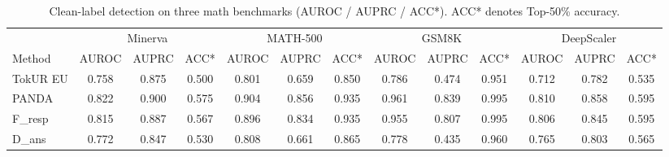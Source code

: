 \begin{table}[t]
\centering
\caption{Clean-label detection on three math benchmarks (AUROC / AUPRC / ACC*). ACC* denotes Top-50\% accuracy.}
\label{tab:main}
\small
\begin{tabular}{l|ccc|ccc|ccc|ccc}
\toprule
 & \multicolumn{3}{c}{Minerva} & \multicolumn{3}{c}{MATH-500} & \multicolumn{3}{c}{GSM8K} & \multicolumn{3}{c}{DeepScaler} \\
\cmidrule(lr){2-4} \cmidrule(lr){5-7} \cmidrule(lr){8-10} \cmidrule(lr){11-13}
Method & AUROC & AUPRC & ACC* & AUROC & AUPRC & ACC* & AUROC & AUPRC & ACC* & AUROC & AUPRC & ACC* \\
\midrule
TokUR EU & 0.758 & 0.875 & 0.500 & 0.801 & 0.659 & 0.850 & 0.786 & 0.474 & 0.951 & 0.712 & 0.782 & 0.535 \\ \midrule
PANDA & 0.822 & 0.900 & 0.575 & 0.904 & 0.856 & 0.935 & 0.961 & 0.839 & 0.995 & 0.810 & 0.858 & 0.595 \\
F\_resp & 0.815 & 0.887 & 0.567 & 0.896 & 0.834 & 0.935 & 0.955 & 0.807 & 0.995 & 0.806 & 0.845 & 0.595 \\
D\_ans & 0.772 & 0.847 & 0.530 & 0.808 & 0.661 & 0.865 & 0.778 & 0.435 & 0.960 & 0.765 & 0.803 & 0.565 \\
\bottomrule
\end{tabular}
\end{table}
